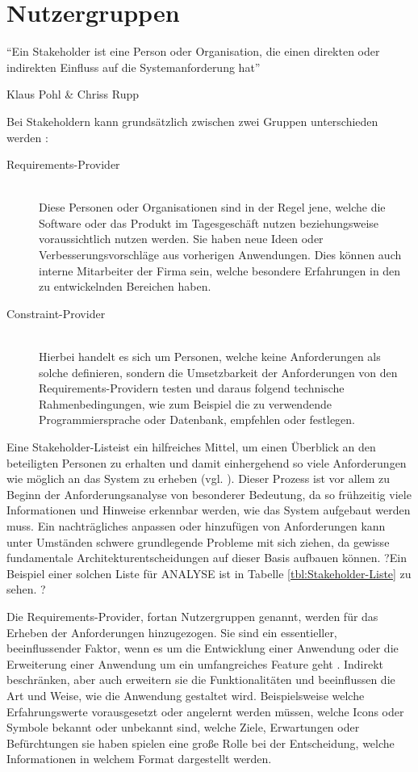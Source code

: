 \section{Nutzergruppen}
\label{sec:nutzergruppen}
\epigraph{"`Ein Stakeholder ist eine Person oder Organisation, die einen direkten oder indirekten Einfluss auf die Systemanforderung hat"'} {Klaus Pohl \& Chriss Rupp \cite[S.29]{Pohl.2011}}

Bei Stakeholdern kann grundsätzlich zwischen zwei Gruppen unterschieden werden \cite{Leffingwell.2011}:
\begin{description}
\item [Requirements-Provider] \hfill \\
Diese Personen oder Organisationen sind in der Regel jene, welche die Software oder das Produkt im Tagesgeschäft nutzen beziehungsweise voraussichtlich nutzen werden.
Sie haben neue Ideen oder Verbesserungsvorschläge aus vorherigen Anwendungen.
Dies können auch interne Mitarbeiter der Firma sein, welche besondere Erfahrungen in den zu entwickelnden Bereichen haben. %
\item [Constraint-Provider] \hfill \\
Hierbei handelt es sich um Personen, welche keine Anforderungen als solche definieren, sondern die Umsetzbarkeit der Anforderungen von den Requirements-Providern testen und daraus folgend technische Rahmenbedingungen, wie zum Beispiel die zu verwendende  Programmiersprache oder Datenbank, empfehlen oder festlegen.
\end{description}

Eine \glqq Stakeholder-Liste\grqq ist ein hilfreiches Mittel, um einen Überblick an den beteiligten Personen zu erhalten und damit einhergehend so viele Anforderungen wie möglich an das System zu erheben (vgl. \cite[S. 83]{Bergsmann.2018}).
Dieser Prozess ist vor allem zu Beginn der Anforderungsanalyse von besonderer Bedeutung, da so frühzeitig viele Informationen und Hinweise erkennbar werden, wie das System aufgebaut werden muss.
Ein nachträgliches anpassen oder hinzufügen von Anforderungen kann unter Umständen schwere grundlegende Probleme mit sich ziehen, da gewisse fundamentale Architekturentscheidungen auf dieser Basis aufbauen können.
?Ein Beispiel einer solchen Liste für \gls{ANALYSE} ist in Tabelle \ref{tbl:Stakeholder-Liste} zu sehen. ?

Die Requirements-Provider, fortan Nutzergruppen genannt, werden für das Erheben der Anforderungen hinzugezogen.
Sie sind ein essentieller, beeinflussender Faktor, wenn es um die Entwicklung einer Anwendung oder die Erweiterung einer Anwendung um ein umfangreiches Feature geht \cite[S. 125]{Herczeg.2018}.
Indirekt beschränken, aber auch erweitern sie die Funktionalitäten und beeinflussen die Art und Weise, wie die Anwendung gestaltet wird. 
Beispielsweise welche Erfahrungswerte vorausgesetzt oder angelernt werden müssen, welche Icons oder Symbole bekannt oder unbekannt sind, welche Ziele, Erwartungen oder Befürchtungen sie haben spielen eine große Rolle bei der Entscheidung, welche Informationen in welchem Format dargestellt werden.

